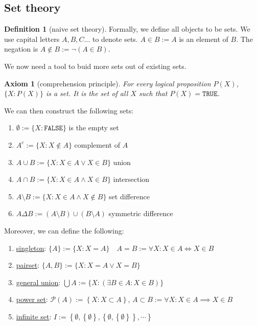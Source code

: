 \documentclass{article}
\renewcommand\O{\ensuremath{\emptyset}}
\newtheorem{axiom}{Axiom}[subsection]
\theoremstyle{definition}
\newtheorem{definition}{Definition}[subsection]
\theoremstyle{remark}
\theoremstyle{plain}
\begin{document}
\subsection{Set theory}

\begin{definition}[naive set theory]
    
    Formally, we define all objects to be sets. We use capital letters $A,B,C\ldots$ to denote sets. $A \in B := A$ is an element of $B. $ The negation is $ A\notin B := \lnot(A\in B)$.  

\end{definition}

We now need a tool to buid more sets out of existing sets. 

\begin{axiom}[comprehension principle]
    For every logical proposition $P(X)$, $\{X: P(X)\}$ is a set. It is the set of all $X$ such that $P(X) = \texttt{TRUE}$.
\end{axiom}

We can then construct the following sets:
\begin{enumerate}
    \item $\O := \{X : \texttt{FALSE} \}$ is the empty set
    \item $A^c := \{X:X\notin A\}$ complement of $A$
    \item $A\cup B := \{X:X\in A \lor X \in B\}$ union
    \item $A\cap B := \{X: X \in A \land X \in B\}$ intersection
    \item $A\setminus B := \{X: X \in A \land X \notin B \}$ set difference
    \item $A \Delta B := (A\setminus B)\cup(B\setminus A)$ symmetric difference 
\end{enumerate}

Moreover, we can define the following:

\begin{enumerate}
    \item \underline{singleton}: $\{A\} := \{X: X = A\} \quad A = B:= \forall X:X\in A \iff X\in B$
    \item \underline{pairset}: $\{A,B\} := \{X:X=A \lor X = B\}$
    \item \underline{general union}: $\bigcup A := \{X: (\exists B\in A : X\in B) \}$
    \item \underline{power set}: $\mathcal{P}(A) := \left\{ X: X \subset A \right\}$, $A\subset B := \forall X: X\in A \implies X \in B $ 
    \item \underline{infinite set}: $I := \left\{ \O, \left\{ \O \right\}, \left\{ \O, \left\{ \O \right\}  \right\}, \cdots \right\}$
\end{enumerate}
\end{document}

